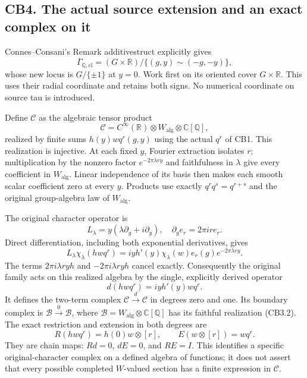\subsection{CB4. The actual source extension and an exact complex on
it}\label{cb4.-the-actual-source-extension-and-an-exact-complex-on-it}

Connes--Consani's Remark additivestruct explicitly gives \[
\overline\Gamma_{\mathbb Q,\mathrm{cl}}
=(G\times\mathbb R)/\{(g,y)\sim(-g,-y)\},
\] whose new locus is \(G/\{\pm1\}\) at \(y=0\). Work first on its
oriented cover \(G\times\mathbb R\). This uses their radial coordinate
and retains both signs. No numerical coordinate on source tau is
introduced.

Define \(\mathcal C\) as the algebraic tensor product \[
\mathcal C=C^\infty(\mathbb R)\otimes W_{\mathrm{alg}}\otimes\mathbb C[\mathbb Q],
\] realized by finite sums \(h(y)wq^r(g,y)\) using the actual \(q^r\) of
CB1. This realization is injective. At each fixed \(y\), Fourier
extraction isolates \(r\); multiplication by the nonzero factor
\(e^{-2\pi\lambda r y}\) and faithfulness in \(\lambda\) give every
coefficient in \(W_{\mathrm{alg}}\). Linear independence of its basis
then makes each smooth scalar coefficient zero at every \(y\). Products
use exactly \(q^rq^s=q^{r+s}\) and the original group-algebra law of
\(W_{\mathrm{alg}}\).

The original character operator is \[
L_\lambda=y(\lambda\partial_g+i\partial_y),
\quad \partial_g e_r=2\pi ir e_r.
\] Direct differentiation, including both exponential derivatives, gives
\[
L_\lambda\chi_\lambda(h w q^r)
=iy h'(y)\chi_\lambda(w)e_r(g)e^{-2\pi\lambda r y}.
\tag{CB4.1}
\] The terms \(2\pi i\lambda r y h\) and \(-2\pi i\lambda r y h\) cancel
exactly. Consequently the original family acts on this realized algebra
by the single, explicitly derived operator \[
d(h w q^r)=iyh'(y)wq^r.
\] It defines the two-term complex
\(\mathcal C\xrightarrow d\mathcal C\) in degrees zero and one. Its
boundary complex is \(\mathcal B\xrightarrow0\mathcal B\), where
\(\mathcal B=W_{\mathrm{alg}}\otimes\mathbb C[\mathbb Q]\) has its
faithful realization (CB3.2). The exact restriction and extension in
both degrees are \[
R(h w q^r)=h(0)w\otimes[r],\qquad
E(w\otimes[r])=wq^r.
\tag{CB4.2}
\] They are chain maps: \(Rd=0\), \(dE=0\), and \(RE=I\). This
identifies a specific original-character complex on a defined algebra of
functions; it does not assert that every possible completed \(W\)-valued
section has a finite expression in \(\mathcal C\).

